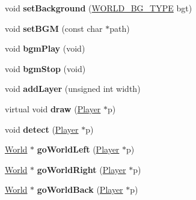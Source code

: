 \begin{DoxyCompactItemize}
\item 
\hypertarget{classWorld_a7700979d3d1674dc3d746dff87e522ed}{}void {\bfseries set\+Background} (\hyperlink{world_8h_a0678a0e576121a23798fdbd5964143c5}{W\+O\+R\+L\+D\+\_\+\+B\+G\+\_\+\+T\+Y\+P\+E} bgt)\label{classWorld_a7700979d3d1674dc3d746dff87e522ed}

\item 
\hypertarget{classWorld_a2a90eea0f52e3ca5df95b8526450bb64}{}void {\bfseries set\+B\+G\+M} (const char $\ast$path)\label{classWorld_a2a90eea0f52e3ca5df95b8526450bb64}

\item 
\hypertarget{classWorld_a837cda808f18afd4f4296c4ebb08507f}{}void {\bfseries bgm\+Play} (void)\label{classWorld_a837cda808f18afd4f4296c4ebb08507f}

\item 
\hypertarget{classWorld_ab0b3691cd6afd82c7f5fc8a625a8746e}{}void {\bfseries bgm\+Stop} (void)\label{classWorld_ab0b3691cd6afd82c7f5fc8a625a8746e}

\item 
\hypertarget{classWorld_aa66f71e6886ac0dade68556163017041}{}void {\bfseries add\+Layer} (unsigned int width)\label{classWorld_aa66f71e6886ac0dade68556163017041}

\item 
\hypertarget{classWorld_af52317a2706b62f472457a926c231f46}{}virtual void {\bfseries draw} (\hyperlink{classPlayer}{Player} $\ast$p)\label{classWorld_af52317a2706b62f472457a926c231f46}

\item 
\hypertarget{classWorld_a4749d1dbffaed4e4487cc5f4086e481e}{}void {\bfseries detect} (\hyperlink{classPlayer}{Player} $\ast$p)\label{classWorld_a4749d1dbffaed4e4487cc5f4086e481e}

\item 
\hypertarget{classWorld_accb9975a135094ecebbe88739b72ab1b}{}\hyperlink{classWorld}{World} $\ast$ {\bfseries go\+World\+Left} (\hyperlink{classPlayer}{Player} $\ast$p)\label{classWorld_accb9975a135094ecebbe88739b72ab1b}

\item 
\hypertarget{classWorld_a184a431e5695fbdba411ba2baa5aee0b}{}\hyperlink{classWorld}{World} $\ast$ {\bfseries go\+World\+Right} (\hyperlink{classPlayer}{Player} $\ast$p)\label{classWorld_a184a431e5695fbdba411ba2baa5aee0b}

\item 
\hypertarget{classWorld_a46221c8af2234749e3416a45d560ec1c}{}\hyperlink{classWorld}{World} $\ast$ {\bfseries go\+World\+Back} (\hyperlink{classPlayer}{Player} $\ast$p)\label{classWorld_a46221c8af2234749e3416a45d560ec1c}


\end{DoxyCompactItemize}

